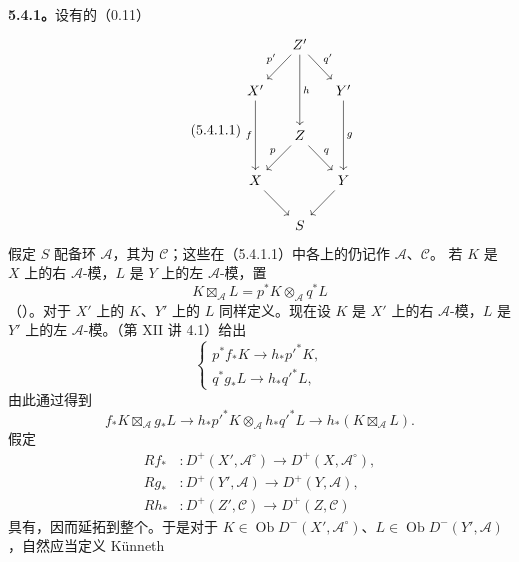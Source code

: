 \textbf{5.4.1。}设有的（0.11）
\begin{equation}\tag{5.4.1.1}
\begin{tikzcd}[column sep=small]
 &Z'\arrow[dl,"p'"']\arrow[dr,"q'"]\arrow[dd,"h"]&\\
 X'\arrow[dd,"f"']&&Y'\arrow[dd,"g"]\\
 &Z\arrow[dl,"p"']\arrow[dr,"q"]&\\
 X\arrow[dr]&&Y\arrow[dl]\\&S&
\end{tikzcd}
\end{equation}
假定 $S$ 配备环 $\mathscr A$，其为 $\mathscr C$；这些在（5.4.1.1）中各上的仍记作 $\mathscr A$、$\mathscr C$。
若 $K$ 是 $X$ 上的右 $\mathscr A$-模，$L$ 是 $Y$ 上的左 $\mathscr A$-模，置
\[K\boxtimes_{\mathscr A}L=p^*K\otimes_{\mathscr A}q^*L\]
（）。对于 $X'$ 上的 $K$、$Y'$ 上的 $L$ 同样定义。现在设 $K$ 是 $X'$ 上的右 $\mathscr A$-模，$L$ 是 $Y'$ 上的左 $\mathscr A$-模。（第 XII 讲 4.1）给出
\begin{equation}\tag{5.4.1.2}
\begin{cases}p^*f_*K\longrightarrow h_*p'^*K,\\q^*g_*L\longrightarrow h_*q'^*L,\end{cases}
\end{equation}
由此通过得到
\begin{equation}\tag{5.4.1.3}
f_*K\boxtimes_{\mathscr A}g_*L\longrightarrow
 h_*p'^*K\otimes_{\mathscr A}h_*q'^*L\longrightarrow h_*(K\boxtimes_{\mathscr A}L).
\end{equation}
假定
\[\begin{aligned}
 Rf_* &:D^+(X',\mathscr A^\circ)\longrightarrow D^+(X,\mathscr A^\circ),\\
 Rg_* &:D^+(Y',\mathscr A)\longrightarrow D^+(Y,\mathscr A),\\
 Rh_* &:D^+(Z',\mathscr C)\longrightarrow D^+(Z,\mathscr C)
\end{aligned}\]
具有，因而延拓到整个。于是对于 $K\in\operatorname{Ob}D^-(X',\mathscr A^\circ)$、$L\in\operatorname{Ob}D^-(Y',\mathscr A)$，自然应当定义 Künneth 
